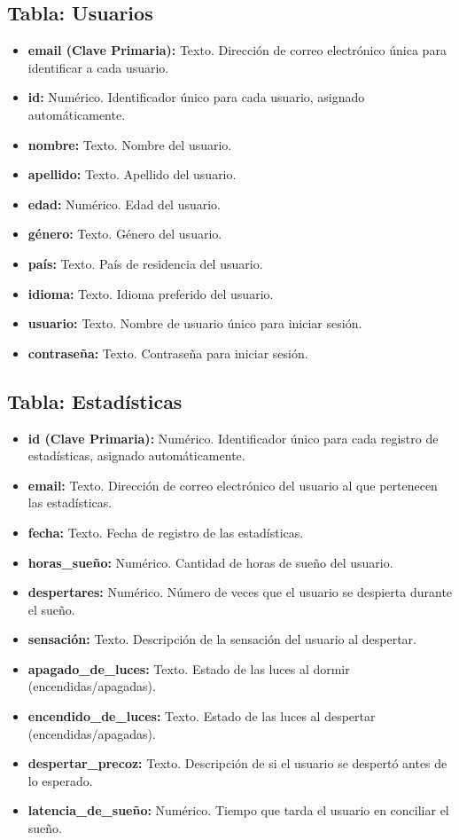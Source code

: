 \documentclass[a4paper,12pt,twoside]{memoir}
\begin{document}
\subsection*{Tabla: Usuarios}
\begin{itemize}
  \item \textbf{email (Clave Primaria):} Texto. Dirección de correo electrónico única para identificar a cada usuario.
  \item \textbf{id:} Numérico. Identificador único para cada usuario, asignado automáticamente.
  \item \textbf{nombre:} Texto. Nombre del usuario.
  \item \textbf{apellido:} Texto. Apellido del usuario.
  \item \textbf{edad:} Numérico. Edad del usuario.
  \item \textbf{género:} Texto. Género del usuario.
  \item \textbf{país:} Texto. País de residencia del usuario.
  \item \textbf{idioma:} Texto. Idioma preferido del usuario.
  \item \textbf{usuario:} Texto. Nombre de usuario único para iniciar sesión.
  \item \textbf{contraseña:} Texto. Contraseña para iniciar sesión.
\end{itemize}

\subsection*{Tabla: Estadísticas}
\begin{itemize}
  \item \textbf{id (Clave Primaria):} Numérico. Identificador único para cada registro de estadísticas, asignado automáticamente.
  \item \textbf{email:} Texto. Dirección de correo electrónico del usuario al que pertenecen las estadísticas.
  \item \textbf{fecha:} Texto. Fecha de registro de las estadísticas.
  \item \textbf{horas\_sueño:} Numérico. Cantidad de horas de sueño del usuario.
  \item \textbf{despertares:} Numérico. Número de veces que el usuario se despierta durante el sueño.
  \item \textbf{sensación:} Texto. Descripción de la sensación del usuario al despertar.
  \item \textbf{apagado\_de\_luces:} Texto. Estado de las luces al dormir (encendidas/apagadas).
  \item \textbf{encendido\_de\_luces:} Texto. Estado de las luces al despertar (encendidas/apagadas).
  \item \textbf{despertar\_precoz:} Texto. Descripción de si el usuario se despertó antes de lo esperado.
  \item \textbf{latencia\_de\_sueño:} Numérico. Tiempo que tarda el usuario en conciliar el sueño.
\end{itemize}
\end{document}
